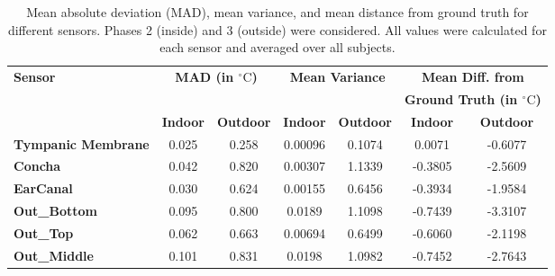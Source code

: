 \begin{table}[t]
\centering
\begin{tabular}{|p{2.5cm}|c|c|c|c|c|c|}
\hline
\textbf{Sensor} & \multicolumn{2}{c|}{\textbf{MAD (in \(^\circ\text{C}\))}} & \multicolumn{2}{c|}{\textbf{Mean Variance}} & \multicolumn{2}{c|}{\textbf{Mean Diff. from}} \\
 & \multicolumn{2}{c|}{} & \multicolumn{2}{c|}{} & \multicolumn{2}{c|}{\textbf{Ground Truth (in \(^\circ\text{C}\))}} \\
\hline
 & \textbf{Indoor} & \textbf{Outdoor} & \textbf{Indoor} & \textbf{Outdoor} & \textbf{Indoor} & \textbf{Outdoor} \\
\hline
\textbf{Tympanic Membrane} & 0.025 & 0.258 & 0.00096 & 0.1074 & 0.0071 & -0.6077 \\
\textbf{Concha} & 0.042 & 0.820 & 0.00307 & 1.1339 & -0.3805 & -2.5609 \\
\textbf{EarCanal} & 0.030 & 0.624 & 0.00155 & 0.6456 & -0.3934 & -1.9584 \\
\textbf{Out\_Bottom} & 0.095 & 0.800 & 0.0189 & 1.1098 & -0.7439 & -3.3107 \\
\textbf{Out\_Top} & 0.062 & 0.663 & 0.00694 & 0.6499 & -0.6060 & -2.1198 \\
\textbf{Out\_Middle} & 0.101 & 0.831 & 0.0198 & 1.0982 & -0.7452 & -2.7643 \\
\hline
\end{tabular}
\caption{Mean absolute deviation (MAD), mean variance, and mean distance from ground truth for different sensors. Phases 2 (inside) and 3 (outside) were considered. All values were calculated for each sensor and averaged over all subjects.}
\label{subsec:Evaluation:Study2:Hypothesis2:mean_variance_table}
\end{table}

